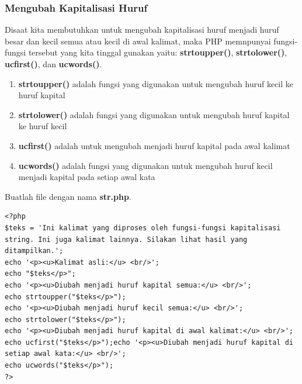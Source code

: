 \subsubsection{Mengubah Kapitalisasi Huruf}
Disaat kita membutuhkan untuk mengubah kapitalisasi huruf menjadi huruf besar dan kecil semua atau kecil di awal kalimat, maka PHP memnpunyai fungsi-fungsi tersebut yang kita tinggal gunakan yaitu: \textbf{strtoupper()}, \textbf{strtolower()}, \textbf{ucfirst()}, dan \textbf{ucwords()}. 
\begin{enumerate}
\item \textbf{strtoupper()} adalah fungsi yang digunakan untuk mengubah huruf kecil ke huruf kapital
\item \textbf{strtolower()} adalah fungsi yang digunakan untuk mengubah huruf kapital ke huruf kecil
\item \textbf{ucfirst()} adalah untuk mengubah menjadi huruf kapital pada awal kalimat
\item \textbf{ucwords()} adalah fungsi yang digunakan untuk mengubah huruf kecil menjadi kapital pada setiap awal kata
\end{enumerate}
Buatlah file dengan nama \textbf{str.php}.
\begin{lstlisting}
<?php
$teks = 'Ini kalimat yang diproses oleh fungsi-fungsi kapitalisasi string. Ini juga kalimat lainnya. Silakan lihat hasil yang ditampilkan.';
echo '<p><u>Kalimat asli:</u> <br/>';
echo "$teks</p>";
echo '<p><u>Diubah menjadi huruf kapital semua:</u> <br/>';
echo strtoupper("$teks</p>");
echo '<p><u>Diubah menjadi huruf kecil semua:</u> <br/>';
echo strtolower("$teks</p>");
echo '<p><u>Diubah menjadi huruf kapital di awal kalimat:</u> <br/>';
echo ucfirst("$teks</p>");echo '<p><u>Diubah menjadi huruf kapital di setiap awal kata:</u> <br/>';
echo ucwords("$teks</p>");
?>
\end{lstlisting}

